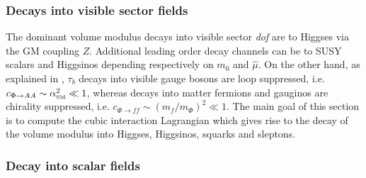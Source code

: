\documentclass[11pt,a4paper]{article}
\def\SM{{\scriptscriptstyle \rm SM}}
\begin{document}
\subsubsection{Decays into visible sector fields}

The dominant volume modulus decays into visible sector \textit{dof} are to Higgses via the GM coupling $Z$. Additional leading order decay channels can be to SUSY scalars and Higgsinos depending respectively on $m_0$ and $\hat\mu$. On the other hand, as explained in \cite{DR1,DR2}, $\tau_b$ decays into visible gauge bosons are loop suppressed, i.e. $c_{\Phi\to A A}\sim \alpha_\SM^2 \ll 1$, whereas decays into matter fermions and gauginos are chirality suppressed, i.e. $c_{\Phi\to f f}\sim \left(m_f/m_\Phi\right)^2 \ll 1$. The main goal of this section is to compute the cubic interaction Lagrangian which gives rise to the decay of the volume modulus into Higgses, Higgsinos, squarks and sleptons.

\subsubsection*{Decay into scalar fields}
\end{document}
